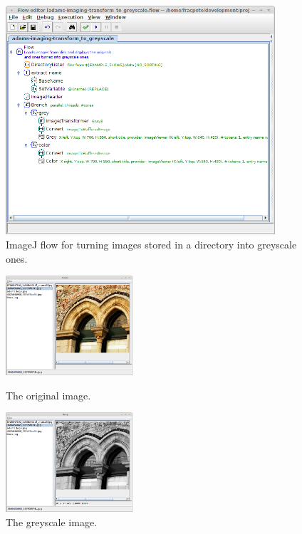 \documentclass[a4paper]{book}
\begin{document}
\begin{figure}[htb]
  \centering
  \includegraphics[width=10.0cm]{images/imagej-greyscale-flow.png}
  \caption{ImageJ flow for turning images stored in a directory into greyscale
  ones.}
  \label{imagej-greyscale-flow}
\end{figure}

\begin{figure}[htb]
  \begin{minipage}[b]{0.48\linewidth}
  \centering
  \includegraphics[height=3.7cm]{images/imagej-greyscale-output-original.png}
  \caption{The original image.}
  \label{imagej-greyscale-output-original}
  \end{minipage}%
  \begin{minipage}[b]{0.48\linewidth}
  \centering
  \includegraphics[height=3.7cm]{images/imagej-greyscale-output-grey.png}
  \caption{The greyscale image.}
  \label{imagej-greyscale-output-grey}
  \end{minipage}
\end{figure}
\end{document}
